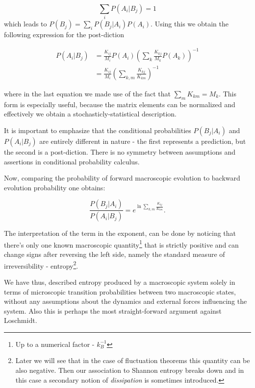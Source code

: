 \documentclass[a4paper,12pt]{article}
\begin{document}
\begin{equation}
  \sum_i P(A_i|B_j) = 1
\end{equation}
which leads to $P(B_j) = \sum_i P(B_j|A_i)P(A_i)$. Using this we obtain the following expression for the post-diction

\begin{equation}
\begin{aligned}
  P(A_i|B_j) &= \frac{K_{ij}}{M_i} P(A_i) \left( \sum_k \frac{K_{kj}}{M_k}P(A_k) \right)^{-1}\\
  &= \frac{K_{ij}}{M_i} \left( \sum_{k,m} \frac{K_{kj}}{K_{km}} \right)^{-1}
\end{aligned}
\end{equation}

where in the last equation we made use of the fact that $\sum_m K_{km}=M_k $.
This form is especially useful, because the matrix elements can be normalized and effectively we obtain a stochasticly-statistical description.

It is important to emphasize that the conditional probabilities $P(B_j|A_i)$ and $P(A_i|B_j)$ are entirely different in nature - the first represents a prediction, but the second is a post-diction. There is no symmetry between assumptions and assertions in conditional probability calculus.

Now, comparing the probability of forward macroscopic evolution to backward evolution probability one obtains: 

\begin{equation}
\label{MacrostatesPRatio}
  \frac{P(B_j|A_i)}{P(A_i|B_j)}= e^{\ln{\sum_{k,m} \frac{K_{kj}}{K_{km}}}}.
\end{equation}


The interpretation of the term in the exponent, can be done by noticing that there's only one known macroscopic quantity\footnote{Up to a numerical factor - $k_B^{-1}$} that is strictly positive and can change signs after reversing the left side, namely the standard measure of irreversibility - entropy\footnote{Later we will see that in the case of fluctuation theorems this quantity can be also negative. Then our association to Shannon entropy breaks down and in this case a secondary notion of \textit{dissipation} is sometimes introduced.}.

We have thus, described entropy produced by a macroscopic system solely in terms of microscopic transition probabilities between two macroscopic states, without any assumptions about the dynamics and external forces influencing the system. Also this is perhaps the most straight-forward argument against Loschmidt.
\end{document}
